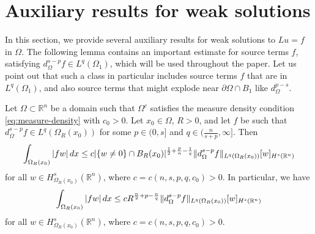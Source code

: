 \documentclass[11pt,reqno]{amsart}
\theoremstyle{plain}
\theoremstyle{definition}
\numberwithin{equation}{section}
\newcommand{\R}{\mathbb{R}}
\newcommand{\1}{\mathbbm{1}}
\renewcommand{\d}{\textnormal{\,d}}
\begin{document}
\section{Auxiliary results for weak solutions}
\label{sec:aux}

In this section, we provide several auxiliary results for weak solutions to $Lu=f$ in $\Omega$. The following lemma contains an important estimate for source terms $f$, satisfying $d^{s-p}_{\Omega} f \in L^q(\Omega_1)$, which will be used throughout the paper. Let us point out that such a class in particular includes source terms $f$ that are in $L^q(\Omega_1)$, and also source terms that might explode near $\partial \Omega \cap B_1$ like $d_{\Omega}^{p-s}$.

\begin{lemma}
\label{lemma:fw-integral}
Let $\Omega \subset \R^n$ be a domain such that $\Omega^c$ satisfies the measure density condition \eqref{eq:measure-density} with $c_0>0$. Let $x_0 \in \Omega$, $R>0$, and let $f$ be such that $d^{s-p}_{\Omega} f \in L^{q}(\Omega_R(x_0))$ for some $p \in (0,s]$ and $q \in (\frac{n}{s+p}, \infty]$. Then
\begin{align}\label{eq-fw-integral-2}
        \int_{\Omega_R(x_0)} |fw| \d x \le c |\{ w \not = 0 \} \cap B_R(x_0)|^{\frac{1}{2} + \frac{p}{n} - \frac{1}{q}} \Vert d_{\Omega}^{s-p} f \Vert_{L^q(\Omega_R(x_0))} [w]_{H^s(\R^n)}
\end{align}
for all $w \in H^s_{\Omega_R(x_0)}(\R^n)$, where $c=c(n,s,p,q,c_0) > 0$.
In particular, we have
\begin{align}\label{eq-fw-integral}
    \int_{\Omega_R(x_0)} |fw| \d x \le c R^{\frac{n}{2} + p - \frac{n}{q}} \Vert d_{\Omega}^{s-p} f \Vert_{L^q(\Omega_R(x_0))} [w]_{H^s(\R^n)}
\end{align}
for all $w \in H^s_{\Omega_R(x_0)}(\R^n)$, where $c=c(n,s,p,q,c_0) > 0$.
\end{lemma}
\end{document}
